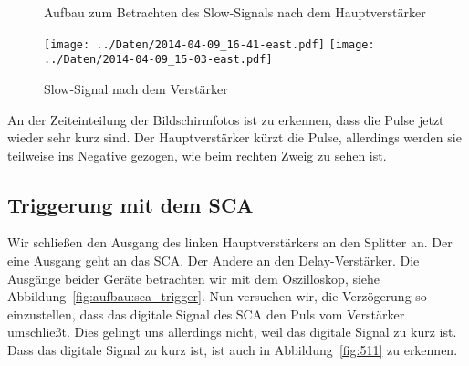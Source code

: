 \begin{figure}[htbp]
    \centering
    \caption{%
        Aufbau zum Betrachten des Slow-Signals nach dem Hauptverstärker
    }
    \label{fig:aufbau:slow_amp}
\end{figure}

\begin{figure}[htbp]
    \centering
    \texttt{[image: ../Daten/2014-04-09\_16-41-east.pdf]}
    \hfill
    \texttt{[image: ../Daten/2014-04-09\_15-03-east.pdf]}
    \caption{%
        Slow-Signal nach dem Verstärker
    }
    \label{fig:slow_amp}
\end{figure}

An der Zeiteinteilung der Bildschirmfotos ist zu erkennen, dass die Pulse jetzt
wieder sehr kurz sind. Der Hauptverstärker kürzt die Pulse, allerdings werden
sie teilweise ins Negative gezogen, wie beim rechten Zweig zu sehen ist.

\subsection{Triggerung mit dem SCA}

Wir schließen den Ausgang des linken Hauptverstärkers an den Splitter an. Der
eine Ausgang geht an das SCA. Der Andere an den Delay-Verstärker. Die Ausgänge
beider Geräte betrachten wir mit dem Oszilloskop, siehe
Abbildung~\ref{fig:aufbau:sca_trigger}. Nun versuchen wir, die Verzögerung so
einzustellen, dass das digitale Signal des SCA den Puls vom Verstärker
umschließt. Dies gelingt uns allerdings nicht, weil das digitale Signal zu kurz
ist. Dass das digitale Signal zu kurz ist, ist auch in Abbildung~\ref{fig:511}
zu erkennen.

